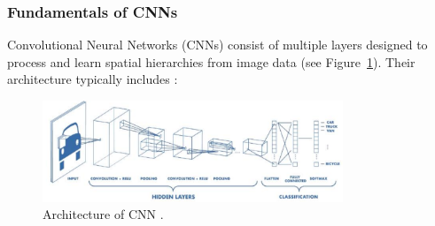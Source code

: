 \subsubsection{Fundamentals of CNNs}
Convolutional Neural Networks (CNNs) consist of multiple layers designed to process and learn spatial hierarchies from image data (see Figure~\ref{fig:figure04}). Their architecture typically includes \parencite{alzubaidi2021review}:

\begin{figure}[H] %
        \centering
        \includegraphics[width=0.8\textwidth]{chapters/chapter1/images/Figure04.png}
        \caption{Architecture of CNN \cite{purwono2022understanding}.}
        \label{fig:figure04}
    \end{figure}

